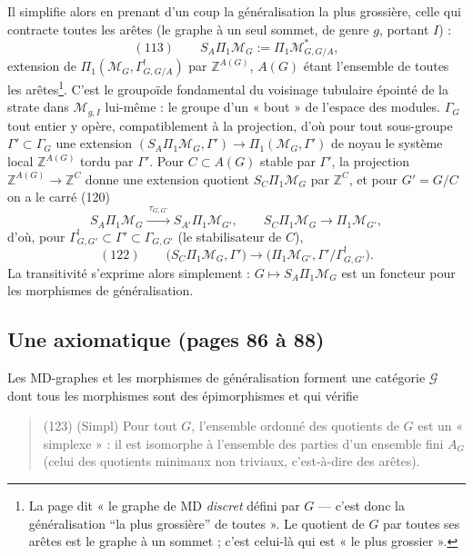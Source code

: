 \documentclass[11pt,a4paper]{article}
\begin{document}
Il simplifie alors en prenant d'un coup la généralisation la plus grossière, celle
qui contracte toutes les arêtes (le graphe à un seul sommet, de genre $g$,
portant $I$) :
\[
(113) \qquad S_A\Pi_1\mathcal{M}_G := \Pi_1 \mathcal{M}^{*}_{G, G/A},
\]
extension de $\Pi_1(\mathcal{M}_G, \Gamma^{!}_{G, G/A})$ par $\mathbb{Z}^{A(G)}$,
$A(G)$ étant l'ensemble de toutes les arêtes\footnote{La page dit « le graphe de
MD \emph{discret} défini par $G$ — c'est donc la généralisation “la plus
grossière” de toutes ». Le quotient de $G$ par toutes ses arêtes est le graphe à
un sommet ; c'est celui-là qui est « le plus grossier ».}. C'est le groupoïde
fondamental du voisinage tubulaire épointé de la strate dans
$\mathcal{M}_{g,I}$ lui-même : le groupe d'un « bout » de l'espace des modules.
$\Gamma_G$ tout entier y opère, compatiblement à la projection, d'où pour tout
sous-groupe $\Gamma' \subset \Gamma_G$ une extension $(S_A\Pi_1\mathcal{M}_G,
\Gamma') \to \Pi_1(\mathcal{M}_G, \Gamma')$ de noyau le système local
$\mathbb{Z}^{A(G)}$ tordu par $\Gamma'$. Pour $C \subset A(G)$ stable par $\Gamma'$,
la projection $\mathbb{Z}^{A(G)} \to \mathbb{Z}^C$ donne une extension quotient
$S_C\Pi_1\mathcal{M}_G$ par $\mathbb{Z}^C$, et pour $G' = G/C$ on a le carré (120)
\[
S_A\Pi_1\mathcal{M}_G \xrightarrow{\ \tau_{G,G'}\ } S_{A'}\Pi_1\mathcal{M}_{G'},
\qquad S_C\Pi_1\mathcal{M}_G \longrightarrow \Pi_1\mathcal{M}_{G'},
\]
d'où, pour $\Gamma^{!}_{G,G'} \subset \Gamma' \subset \Gamma_{G,G'}$ (le stabilisateur
de $C$),
\[
(122) \qquad \bigl(S_C\Pi_1\mathcal{M}_G, \Gamma'\bigr) \longrightarrow
\bigl(\Pi_1\mathcal{M}_{G'}, \Gamma'/\Gamma^{!}_{G,G'}\bigr) .
\]
La transitivité s'exprime alors simplement : $G \mapsto S_A\Pi_1\mathcal{M}_G$
est un foncteur pour les morphismes de généralisation.

\subsection*{Une axiomatique (pages 86 à 88)}

Les MD-graphes et les morphismes de généralisation forment une catégorie
$\mathcal{G}$ dont tous les morphismes sont des épimorphismes et qui vérifie

\begin{quote}
(123) (Simpl) Pour tout $G$, l'ensemble ordonné des quotients de $G$ est un
« simplexe » : il est isomorphe à l'ensemble des parties d'un ensemble fini $A_G$
(celui des quotients minimaux non triviaux, c'est-à-dire des arêtes).
\end{quote}
\end{document}
